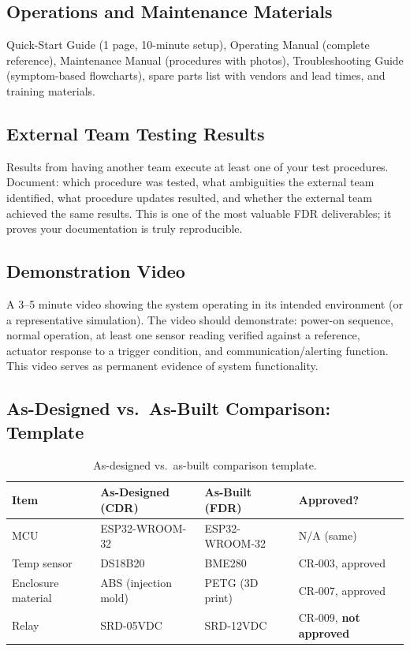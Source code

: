 \subsection{Operations and Maintenance Materials}
Quick-Start Guide (1 page, 10-minute setup), Operating Manual (complete reference), Maintenance Manual (procedures with photos), Troubleshooting Guide (symptom-based flowcharts), spare parts list with vendors and lead times, and training materials.


\subsection{External Team Testing Results}
Results from having another team execute at least one of your test procedures. Document: which procedure was tested, what ambiguities the external team identified, what procedure updates resulted, and whether the external team achieved the same results. This is one of the most valuable FDR deliverables; it proves your documentation is truly reproducible.

\subsection{Demonstration Video}
A 3--5 minute video showing the system operating in its intended environment (or a representative simulation). The video should demonstrate: power-on sequence, normal operation, at least one sensor reading verified against a reference, actuator response to a trigger condition, and communication/alerting function. This video serves as permanent evidence of system functionality.


\subsection{As-Designed vs.\ As-Built Comparison: Template}
\begin{table}[htbp]\centering\small
\begin{tabularx}{\textwidth}{l X X l}
\toprule
\textbf{Item} & \textbf{As-Designed (CDR)} & \textbf{As-Built (FDR)} & \textbf{Approved?} \\
\midrule
MCU & ESP32-WROOM-32 & ESP32-WROOM-32 & N/A (same) \\
Temp sensor & DS18B20 & BME280 & CR-003, approved \\
Enclosure material & ABS (injection mold) & PETG (3D print) & CR-007, approved \\
Relay & SRD-05VDC & SRD-12VDC & CR-009, \textbf{not approved} \\
\bottomrule
\end{tabularx}
\caption{As-designed vs.\ as-built comparison template.}
\end{table}

